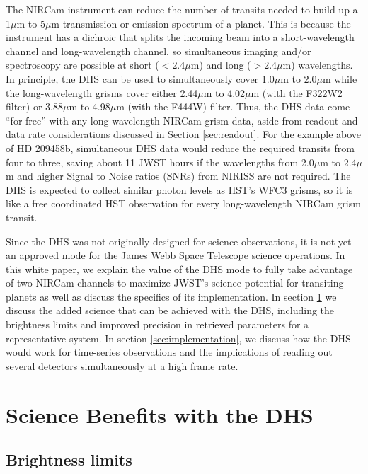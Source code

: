 \documentclass[iop]{emulateapj}
\begin{document}
The NIRCam instrument can reduce the number of transits needed to build up a 1$\mu$m to 5$\mu$m transmission or emission spectrum of a planet.
This is because the instrument has a dichroic that splits the incoming beam into a short-wavelength channel and long-wavelength channel, so simultaneous imaging and/or spectroscopy are possible at short ($<$2.4$\mu$m) and long ($>$2.4$\mu$m) wavelengths.
In principle, the DHS can be used to simultaneously cover 1.0$\mu$m to 2.0$\mu$m while the long-wavelength grisms cover either 2.44$\mu$m to 4.02$\mu$m (with the F322W2 filter) or 3.88$\mu$m to 4.98$\mu$m (with the F444W) filter.
Thus, the DHS data come ``for free'' with any long-wavelength NIRCam grism data, aside from readout and data rate considerations discussed in Section \ref{sec:readout}.
For the example above of HD 209458b, simultaneous DHS data would reduce the required transits from four to three, saving about 11 JWST hours 
if the wavelengths from 2.0$\mu$m to 2.4$\mu$m and higher Signal to Noise ratios (SNRs) from NIRISS are not required.
The DHS is expected to collect similar photon levels as HST's WFC3 grisms, so it is like a free coordinated HST observation for every long-wavelength NIRCam grism transit.

Since the DHS was not originally designed for science observations, it is not yet an approved mode for the James Webb Space Telescope science operations.
In this white paper, we explain the value of the DHS mode to fully take advantage of two NIRCam channels to maximize JWST's science potential for transiting planets as well as discuss the specifics of its implementation.
In section \ref{sec:addedScience} we discuss the added science that can be achieved with the DHS, including the brightness limits and improved precision in retrieved parameters for a representative system.
In section \ref{sec:implementation}, we discuss how the DHS would work for time-series observations and the implications of reading out several detectors simultaneously at a high frame rate.


\section{Science Benefits with the DHS}\label{sec:addedScience}

\subsection{Brightness limits}\label{sec:brightness}
\end{document}
